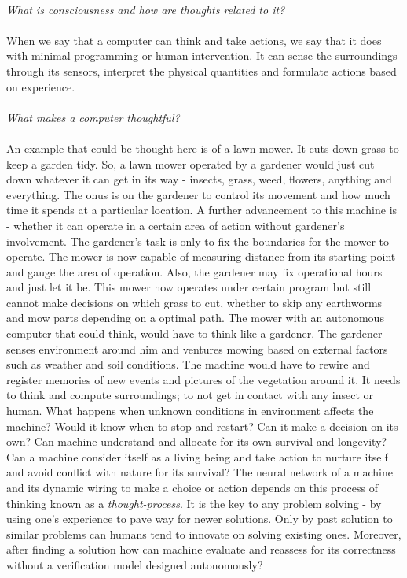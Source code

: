\documentclass[a4paper]{article}
\begin{document}
	\paragraph{}
	\textit{What is consciousness and how are thoughts related to it?}
	\paragraph{}
	When we say that a computer can think and take actions, we say that it does with minimal programming or human
	intervention. It can sense the surroundings through its sensors, interpret the physical quantities and formulate
	actions based on experience.
	\paragraph{}
	\textit{What makes a computer thoughtful?}
	\paragraph{}
	An example that could be thought here is of a lawn mower. It cuts down grass to keep a garden tidy. So, a 
	lawn mower operated by a gardener would just cut down whatever it can get in its way - insects, grass, weed, flowers,
	anything and everything. The onus is on the gardener to control its movement and how much time it spends at a particular
	location. A further advancement to this machine is - whether it can operate in a certain area of action without gardener's
	involvement. The gardener's task is only to fix the boundaries for the mower to operate.
	The mower is now capable of measuring distance from its starting point and gauge the area of operation. Also, the gardener may
	fix operational hours and just let it be. This mower now operates under certain program but still cannot make decisions on which
	grass to cut, whether to skip any earthworms and mow parts depending on a optimal path. The mower with an autonomous computer
	that could think, would have to think like a gardener. The gardener senses environment around him and ventures mowing based on external
	factors such as weather and soil conditions. The machine would have to rewire and register memories of new events and pictures of the
	vegetation around it. It needs to think and compute surroundings; to not get in contact with any insect or human. What happens when unknown
	conditions in environment affects the machine? Would it know when to stop and restart? Can it make a decision on its own? Can machine
	understand and allocate for its own survival and longevity? Can a machine consider itself as a living being and take action to 
	nurture itself and avoid conflict with nature for its survival? The neural network of a machine and its dynamic wiring to make a choice
	or action depends on this process of thinking known as a \textit{thought-process}. It is the key to any problem solving - by using one's
	experience to pave way for newer solutions. Only by past solution to similar problems can humans tend to innovate on solving existing ones.
	Moreover, after finding a solution how can machine evaluate and reassess for its correctness without a verification model designed autonomously?
\end{document}
